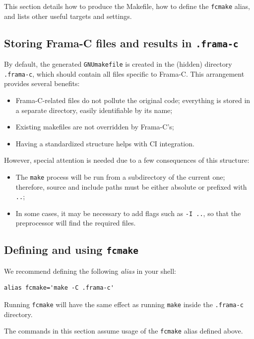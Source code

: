This section details how to produce the Makefile, how to define the
\texttt{fcmake} alias, and lists other useful targets and settings.

\subsection*{Storing Frama-C files and results in \texttt{.frama-c}}

By default, the generated \texttt{GNUmakefile} is created in the (hidden)
directory \texttt{.frama-c}, which should contain all files specific to Frama-C.
This arrangement provides several benefits:

\begin{itemize}
\item Frama-C-related files do not pollute the original code; everything
  is stored in a separate directory, easily identifiable by its name;
\item Existing makefiles are not overridden by Frama-C's;
\item Having a standardized structure helps with CI integration.
\end{itemize}

However, special attention is needed due to a few consequences of this
structure:

\begin{itemize}
\item The \texttt{make} process will be run from a subdirectory of the
  current one; therefore, source and include paths must be either absolute
  or prefixed with \texttt{..};
\item In some cases, it may be necessary to add flags such as \texttt{-I ..},
  so that the preprocessor will find the required files.
\end{itemize}

\subsection*{Defining and using \texttt{fcmake}}

We recommend defining the following {\em alias} in your shell:

\begin{verbatim}
alias fcmake='make -C .frama-c'
\end{verbatim}

Running \texttt{fcmake} will have the same effect as running \texttt{make}
inside the \texttt{.frama-c} directory.

The commands in this section assume usage of the \texttt{fcmake} alias
defined above.

